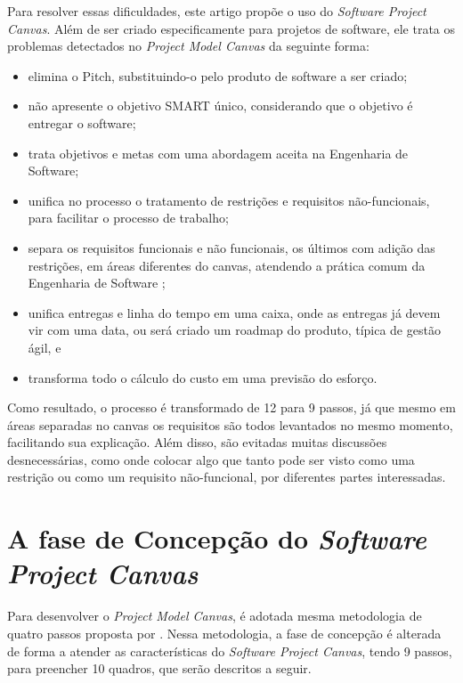 \documentclass{article}
\begin{document}
Para resolver essas dificuldades, este artigo propõe o uso do \textit{Software Project Canvas}. Além de ser criado especificamente para projetos de software, ele trata os problemas detectados no \textit{Project Model Canvas} da seguinte forma:
\begin{itemize}
    \item elimina o Pitch, substituindo-o pelo produto de software a ser criado;
    \item não apresente o objetivo SMART único, considerando que o objetivo é entregar o software;
    \item trata objetivos e metas com uma abordagem aceita na Engenharia de Software\citep{ruble_practical_1997};
    \item unifica no processo o tratamento de restrições e requisitos não-funcionais, para facilitar o processo de trabalho;
    \item separa os requisitos funcionais e não funcionais, os últimos com adição das restrições, em áreas diferentes do canvas, atendendo a prática comum da Engenharia de Software \citep{pressman:2019};
    \item unifica entregas e linha do tempo em uma caixa, onde as entregas já devem vir com uma data, ou será criado um roadmap do produto, típica de gestão ágil, e
    \item transforma todo o cálculo do custo em uma previsão do esforço\citep{mike:agile:estimating}.
\end{itemize}

Como resultado, o processo é transformado de 12 para 9 passos, já que mesmo em áreas separadas no canvas os requisitos são todos levantados no mesmo momento, facilitando sua explicação. Além disso, são evitadas muitas discussões desnecessárias, como onde colocar algo que tanto pode ser visto como uma restrição ou como um requisito não-funcional, por diferentes partes interessadas.

\section{A fase de Concepção do \textit{Software Project Canvas}}

Para desenvolver o \textit{Project Model Canvas}, é adotada  mesma metodologia de quatro passos proposta por \citet{finocchio:2013}. Nessa metodologia, a fase de concepção é alterada de forma a atender as características do \textit{Software Project Canvas}, tendo 9 passos, para preencher 10 quadros, que serão descritos a seguir.
\end{document}
